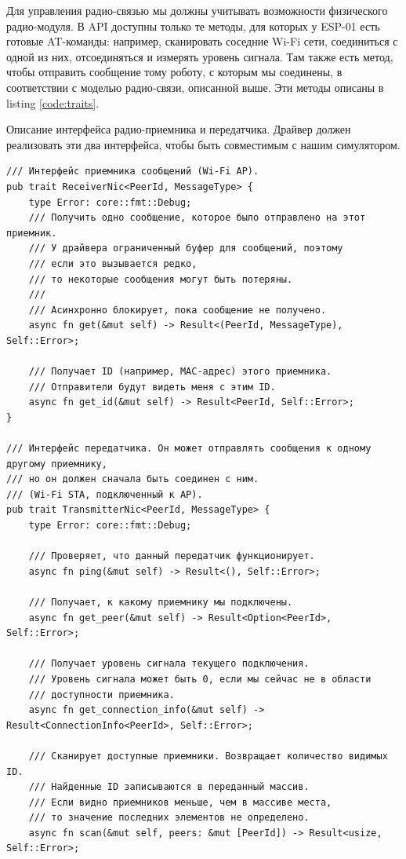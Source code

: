 \documentclass[%
]{article}
\begin{document}
Для управления радио-связью мы должны учитывать возможности физического радио-модуля.
В API доступны только те методы,
для которых у ESP-01 есть готовые AT-команды:
например, сканировать соседние Wi-Fi сети,
соединиться с одной из них,
отсоединяться
и измерять уровень сигнала.
Там также есть метод, чтобы отправить сообщение тому роботу,
с которым мы соединены,
в соответствии с моделью радио-связи, описанной выше.
Эти методы описаны в listing \ref{code:traits}.

\begin{listing}[h]
\caption{Описание интерфейса радио-приемника и передатчика.
Драйвер должен реализовать эти два интерфейса,
чтобы быть совместимым с нашим симулятором.}
\label{code:traits}
\begin{verbatim}
/// Интерфейс приемника сообщений (Wi-Fi AP).
pub trait ReceiverNic<PeerId, MessageType> {
    type Error: core::fmt::Debug;
    /// Получить одно сообщение, которое было отправлено на этот приемник.
    /// У драйвера ограниченный буфер для сообщений, поэтому
    /// если это вызывается редко,
    /// то некоторые сообщения могут быть потеряны.
    ///
    /// Асинхронно блокирует, пока сообщение не получено.
    async fn get(&mut self) -> Result<(PeerId, MessageType), Self::Error>;

    /// Получает ID (например, MAC-адрес) этого приемника.
    /// Отправители будут видеть меня с этим ID.
    async fn get_id(&mut self) -> Result<PeerId, Self::Error>;
}

/// Интерфейс передатчика. Он может отправлять сообщения к одному другому приемнику,
/// но он должен сначала быть соединен с ним.
/// (Wi-Fi STA, подключенный к AP).
pub trait TransmitterNic<PeerId, MessageType> {
    type Error: core::fmt::Debug;

    /// Проверяет, что данный передатчик функционирует.
    async fn ping(&mut self) -> Result<(), Self::Error>;

    /// Получает, к какому приемнику мы подключены.
    async fn get_peer(&mut self) -> Result<Option<PeerId>, Self::Error>;

    /// Получает уровень сигнала текущего подключения.
    /// Уровень сигнала может быть 0, если мы сейчас не в области
    /// доступности приемника.
    async fn get_connection_info(&mut self) -> Result<ConnectionInfo<PeerId>, Self::Error>;

    /// Сканирует доступные приемники. Возвращает количество видимых ID.
    /// Найденные ID записываются в переданный массив.
    /// Если видно приемников меньше, чем в массиве места,
    /// то значение последних элементов не определено.
    async fn scan(&mut self, peers: &mut [PeerId]) -> Result<usize, Self::Error>;


\end{verbatim}
\end{listing}
\end{document}
